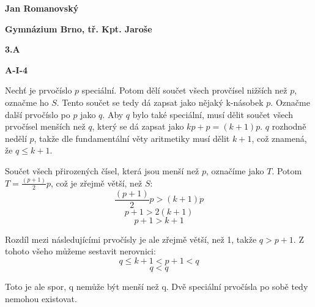\documentclass{article}
\title{\vspace{-2cm}\vspace{-1.7cm}}
\date{}
\author{}
\begin{document}
\maketitle
\noindent \textbf{Jan Romanovský}

\noindent \textbf{Gymnázium Brno, tř. Kpt. Jaroše}

\noindent \textbf{3.A}

\noindent \textbf{A-\textrm{I}-4}

\textbf{ }

Nechť je prvočíslo $p$ speciální. Potom dělí součet všech provčísel nižších než $p$, označme ho $S$. Tento součet se tedy dá zapsat jako nějaký k-násobek $p$. Označme další prvočíslo po $p$ jako $q$. Aby $q$ bylo také speciální, musí dělit součet všech prvočísel menších než $q$, který se dá zapsat jako $kp + p = (k+1)p$. $q$ rozhodně nedělí $p$, takže dle fundamentální věty aritmetiky musí dělit $k+1$, což znamená, že $q \leq k+1$.

Součet všech přirozených čísel, která jsou menší než $p$, označíme jako $T$. Potom $T=\frac{(p+1)}{2}p$, což je zřejmě větší, než $S$:
\[\frac{(p+1)}{2}p>(k+1)p\]
\[p+1>2(k+1)\]
\[p+1>k+1\]

Rozdíl mezi následujícími prvočísly je ale zřejmě větší, než 1, takže $q>p+1$. Z tohoto všeho můžeme sestavit nerovnici:
\[q\leq k+1 < p+1 < q\]
\[q<q\]

Toto je ale spor, q nemůže být menší než q. Dvě speciální prvočísla po sobě tedy nemohou existovat.
\end{document}
